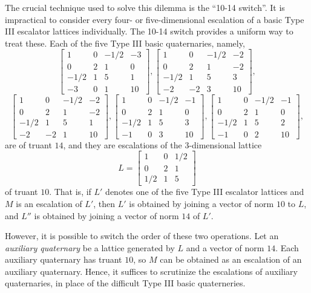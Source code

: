 \documentclass{article}
\begin{document}
The crucial technique used to solve this dilemma is the ``10-14 switch''.
It is impractical to consider every four- or five-dimensional escalation of a basic Type III escalator lattices individually.
The 10-14 switch provides a uniform way to treat these.
Each of the five Type III basic quaternaries, namely,
\[\begin{bmatrix} 1 & 0 & -1/2 & -3 \\ 0 & 2 & 1 & 0 \\ -1/2 & 1 & 5 & 1 \\ -3 & 0 & 1 & 10 \end{bmatrix}, \begin{bmatrix} 1 & 0 & -1/2 & -2 \\ 0 & 2 & 1 & -2 \\ -1/2 & 1 & 5 & 3 \\ -2 & -2 & 3 & 10 \end{bmatrix},\]
\[\begin{bmatrix} 1 & 0 & -1/2 & -2 \\ 0 & 2 & 1 & -2 \\ -1/2 & 1 & 5 & 1 \\ -2 & -2 & 1 & 10 \end{bmatrix}, \begin{bmatrix} 1 & 0 & -1/2 & -1 \\ 0 & 2 & 1 & 0 \\ -1/2 & 1 & 5 & 3 \\ -1 & 0 & 3 & 10 \end{bmatrix}, \begin{bmatrix} 1 & 0 & -1/2 & -1 \\ 0 & 2 & 1 & 0 \\ -1/2 & 1 & 5 & 2 \\ -1 & 0 & 2 & 10 \end{bmatrix},\]
are of truant $14$, and they are escalations of the $3$-dimensional lattice
\[L = \begin{bmatrix} 1 & 0 & 1/2 \\ 0 & 2 & 1 \\ 1/2 & 1 & 5 \end{bmatrix}\]
of truant $10$.
That is, if $L'$ denotes one of the five Type III escalator lattices and $M$ is an escalation of $L'$, then $L'$ is obtained by joining a vector of norm $10$ to $L$, and $L''$ is obtained by joining a vector of norm $14$ of $L'$.

However, it is possible to switch the order of these two operations.
Let an \emph{auxiliary quaternary} be a lattice generated by $L$ and a vector of norm $14$.
Each auxiliary quaternary has truant $10$, so $M$ can be obtained as an escalation of an auxiliary quaternary.
Hence, it suffices to scrutinize the escalations of auxiliary quaternaries, in place of the difficult Type III basic quaterneries.
\end{document}
